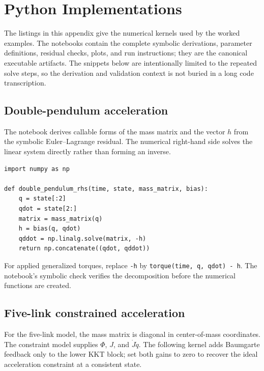\documentclass[../main.tex]{subfiles}
\begin{document}
\chapter{Python Implementations}
\label{app:python-implementations}

The listings in this appendix give the numerical kernels used by the worked examples. The notebooks contain the complete symbolic derivations, parameter definitions, residual checks, plots, and run instructions; they are the canonical executable artifacts. The snippets below are intentionally limited to the repeated solve steps, so the derivation and validation context is not buried in a long code transcription.

\section{Double-pendulum acceleration}
The notebook derives callable forms of the mass matrix and the vector \(h\) from the symbolic Euler--Lagrange residual. The numerical right-hand side solves the linear system directly rather than forming an inverse.

\begin{lstlisting}[caption={First-order right-hand side for the unforced double pendulum},label={lst:double-pendulum-rhs}]
import numpy as np

def double_pendulum_rhs(time, state, mass_matrix, bias):
	q = state[:2]
	qdot = state[2:]
	matrix = mass_matrix(q)
	h = bias(q, qdot)
	qddot = np.linalg.solve(matrix, -h)
	return np.concatenate((qdot, qddot))
\end{lstlisting}

For applied generalized torques, replace \texttt{-h} by \texttt{torque(time, q, qdot) - h}. The notebook's symbolic check verifies the decomposition before the numerical functions are created.

\section{Five-link constrained acceleration}
For the five-link model, the mass matrix is diagonal in center-of-mass coordinates. The constraint model supplies \(\Phi\), \(J\), and \(\dot J\dot q\). The following kernel adds Baumgarte feedback only to the lower KKT block; set both gains to zero to recover the ideal acceleration constraint at a consistent state.
\end{document}
